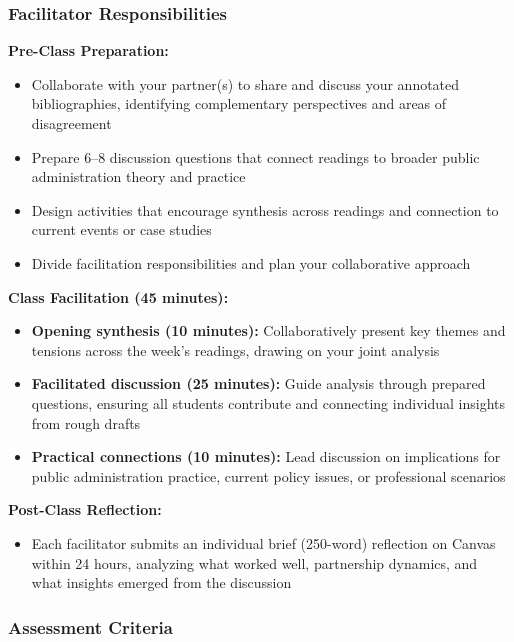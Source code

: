 \documentclass[12pt]{article}     %
\begin{document}
\subsubsection*{Facilitator Responsibilities}

\textbf{Pre-Class Preparation:}
\begin{itemize}
    \item Collaborate with your partner(s) to share and discuss your annotated bibliographies, identifying complementary perspectives and areas of disagreement
    \item Prepare 6--8 discussion questions that connect readings to broader public administration theory and practice
    \item Design activities that encourage synthesis across readings and connection to current events or case studies
    \item Divide facilitation responsibilities and plan your collaborative approach
\end{itemize}

\textbf{Class Facilitation (45 minutes):}
\begin{itemize}
    \item \textbf{Opening synthesis (10 minutes):} Collaboratively present key themes and tensions across the week's readings, drawing on your joint analysis
    \item \textbf{Facilitated discussion (25 minutes):} Guide analysis through prepared questions, ensuring all students contribute and connecting individual insights from rough drafts
    \item \textbf{Practical connections (10 minutes):} Lead discussion on implications for public administration practice, current policy issues, or professional scenarios
\end{itemize}

\textbf{Post-Class Reflection:}
\begin{itemize}
    \item Each facilitator submits an individual brief (250-word) reflection on Canvas within 24 hours, analyzing what worked well, partnership dynamics, and what insights emerged from the discussion
\end{itemize}

\subsubsection*{Assessment Criteria}
\end{document}
